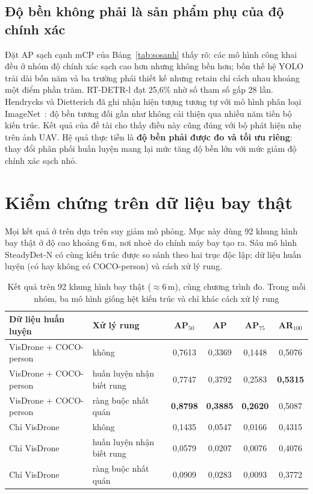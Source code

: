 \subsection{Độ bền không phải là sản phẩm phụ của độ chính xác}

Đặt AP sạch cạnh mCP của Bảng~\ref{tab:sosanh} thấy rõ: các mô hình công khai đều ở nhóm độ chính xác sạch cao hơn nhưng không bền hơn; bốn thế hệ YOLO trải dài bốn năm và ba trường phái thiết kế nhưng retain chỉ cách nhau khoảng một điểm phần trăm. RT-DETR-l đạt 25,6\% nhờ số tham số gấp 28 lần. Hendrycks và Dietterich đã ghi nhận hiện tượng tương tự với mô hình phân loại ImageNet~\cite{hendrycks2019imagenetc}: độ bền tương đối gần như không cải thiện qua nhiều năm tiến bộ kiến trúc. Kết quả của đề tài cho thấy điều này cũng đúng với bộ phát hiện nhẹ trên ảnh UAV. Hệ quả thực tiễn là \textbf{độ bền phải được đo và tối ưu riêng}: thay đổi phân phối huấn luyện mang lại mức tăng độ bền lớn với mức giảm độ chính xác sạch nhỏ.

\section{Kiểm chứng trên dữ liệu bay thật}
\label{sec:baythat}

Mọi kết quả ở trên dựa trên suy giảm mô phỏng. Mục này dùng 92 khung hình bay thật ở độ cao khoảng 6\,m, nơi nhoè do chính máy bay tạo ra. Sáu mô hình SteadyDet-N có cùng kiến trúc được so sánh theo hai trục độc lập: dữ liệu huấn luyện (có hay không có COCO-person) và cách xử lý rung.

\begin{table}[H]
\centering
\caption{Kết quả trên 92 khung hình bay thật ($\approx$6\,m), cùng chương trình đo. Trong mỗi nhóm, ba mô hình giống hệt kiến trúc và chỉ khác cách xử lý rung}
\label{tab:baythat}
\small
\renewcommand{\arraystretch}{1.15}
\begin{tabular}{@{}llcccc@{}}
\toprule
\textbf{Dữ liệu huấn luyện} & \textbf{Xử lý rung} & \textbf{AP$_{50}$} & \textbf{AP} & \textbf{AP$_{75}$} & \textbf{AR$_{100}$}\\
\midrule
VisDrone + COCO-person & không & 0,7613 & 0,3369 & 0,1448 & 0,5076\\
VisDrone + COCO-person & huấn luyện nhận biết rung & 0,7747 & 0,3792 & 0,2583 & \textbf{0,5315}\\
VisDrone + COCO-person & ràng buộc nhất quán & \textbf{0,8798} & \textbf{0,3885} & \textbf{0,2620} & 0,5087\\
\midrule
Chỉ VisDrone & không & 0,1435 & 0,0547 & 0,0166 & 0,4315\\
Chỉ VisDrone & huấn luyện nhận biết rung & 0,0579 & 0,0207 & 0,0076 & 0,4076\\
Chỉ VisDrone & ràng buộc nhất quán & 0,0909 & 0,0283 & 0,0093 & 0,3772\\
\bottomrule
\end{tabular}
\end{table}

